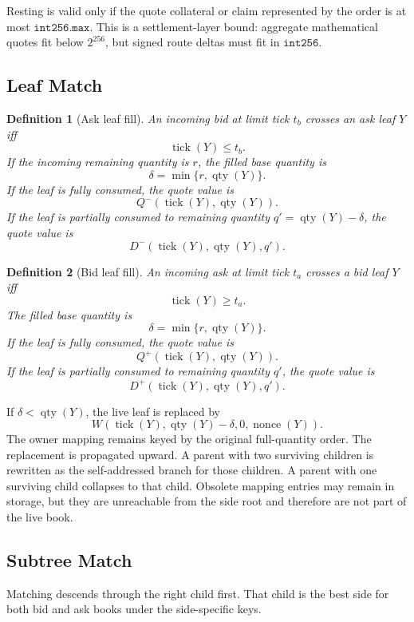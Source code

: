 \documentclass[11pt]{article}
\newtheorem{definition}{Definition}
\DeclareMathOperator{\tick}{tick}
\DeclareMathOperator{\qty}{qty}
\DeclareMathOperator{\nonce}{nonce}
\begin{document}
Resting is valid only if the quote collateral or claim represented by
the order is at most \(\mathtt{int256.max}\).  This is a settlement-layer
bound: aggregate mathematical quotes fit below \(2^{256}\), but signed
route deltas must fit in \(\mathtt{int256}\).

\subsection{Leaf Match}

\begin{definition}[Ask leaf fill]
An incoming bid at limit tick \(t_b\) crosses an ask leaf \(Y\) iff
\[
  \tick(Y)\le t_b.
\]
If the incoming remaining quantity is \(r\), the filled base quantity is
\[
  \delta=\min\{r,\qty(Y)\}.
\]
If the leaf is fully consumed, the quote value is
\[
  Q^{-}(\tick(Y),\qty(Y)).
\]
If the leaf is partially consumed to remaining quantity
\(q'=\qty(Y)-\delta\), the quote value is
\[
  D^{-}(\tick(Y),\qty(Y),q').
\]
\end{definition}

\begin{definition}[Bid leaf fill]
An incoming ask at limit tick \(t_a\) crosses a bid leaf \(Y\) iff
\[
  \tick(Y)\ge t_a.
\]
The filled base quantity is
\[
  \delta=\min\{r,\qty(Y)\}.
\]
If the leaf is fully consumed, the quote value is
\[
  Q^{+}(\tick(Y),\qty(Y)).
\]
If the leaf is partially consumed to remaining quantity \(q'\), the
quote value is
\[
  D^{+}(\tick(Y),\qty(Y),q').
\]
\end{definition}

If \(\delta<\qty(Y)\), the live leaf is replaced by
\[
  W(\tick(Y),\qty(Y)-\delta,0,\nonce(Y)).
\]
The owner mapping remains keyed by the original full-quantity order.
The replacement is propagated upward.  A parent with two surviving
children is rewritten as the self-addressed branch for those children.
A parent with one surviving child collapses to that child.  Obsolete
mapping entries may remain in storage, but they are unreachable from the
side root and therefore are not part of the live book.

\subsection{Subtree Match}

Matching descends through the right child first.  That child is the best
side for both bid and ask books under the side-specific keys.
\end{document}
